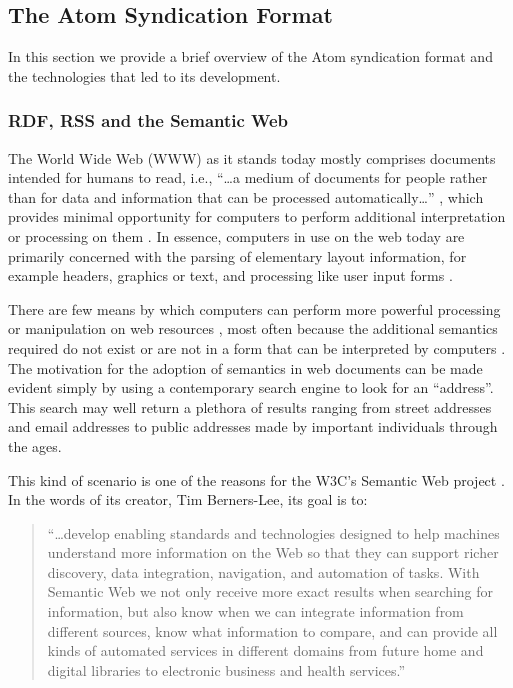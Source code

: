 \documentclass{CRPITStyle}
\begin{document}
\subsection{The Atom Syndication Format}
\label{sec-atom-overview}

In this section we provide a brief overview of the Atom syndication
format and the technologies that led to its development.


\subsubsection{RDF, RSS and the Semantic Web}
\label{sec-rdf-rss}

The World Wide Web (WWW) as it stands today mostly comprises documents
intended for humans to read, i.e., ``\ldots{}a medium of documents for
people rather than for data and information that can be processed
automatically\ldots'' \cite{Bern-T-2001-SciAm}, which provides minimal
opportunity for computers to perform additional interpretation or
processing on them \cite{Bern-T-1999-WWW,Bern-T-2001-SciAm}. In essence,
computers in use on the web today are primarily concerned with the
parsing of elementary layout information, for example headers, graphics
or text, and processing like user input forms
\cite{Bern-T-1999-W3C,Bern-T-2001-SciAm}.

There are few means by which computers can perform more powerful
processing or manipulation on web resources
\cite{Bern-T-2001-SciAm,Fens-D-2003}, most often because the additional
semantics required do not exist or are not in a form that can be
interpreted by computers \cite{Koiv-MR-2001-W3C}. The motivation for the
adoption of semantics in web documents can be made evident simply by
using a contemporary search engine to look for an ``address''. This
search may well return a plethora of results ranging from street
addresses and email addresses to public addresses made by important
individuals through the ages.

This kind of scenario is one of the reasons for the W3C's Semantic Web
project \cite{Koiv-MR-2001-W3C}. In the words of its creator, Tim
Berners-Lee, its goal is to:

\begin{quotation}
	``\ldots{}develop enabling standards and technologies designed to
	help machines understand more information on the Web so that they
	can support richer discovery, data integration, navigation, and
	automation of tasks. With Semantic Web we not only receive more
	exact results when searching for information, but also know when we
	can integrate information from different sources, know what
	information to compare, and can provide all kinds of automated
	services in different domains from future home and digital libraries
	to electronic business and health services.''
	\cite{Koiv-MR-2001-W3C}
\end{quotation}
\end{document}
